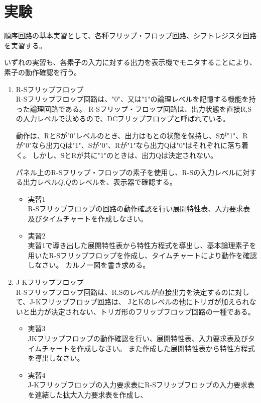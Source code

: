 \documentclass[dvipdfmx]{jsarticle}
\begin{document}
	\section{実験}
		順序回路の基本実習として、各種フリップ・フロップ回路、シフトレジスタ回路を実習する。\par
		いずれの実習も、各素子の入力に対する出力を表示機でモニタすることにより、素子の動作確認を行う。
		\begin{enumerate}
			\item R-Sフリップフロップ \\
				R-Sフリップフロップ回路は、"0"、又は"1"の論理レベルを記憶する機能を持った論理回路である。
				R-Sフリップ・フロップ回路は、出力状態を直接R,Sの入力レベルで決めるので、DCフリップフロップと呼ばれている。\par
				動作は、RとSが"0"レベルのとき、出力はもとの状態を保持し、Sが"1"、Rが"0"なら出力Qは"1"、Sが"0"、Rが"1"なら出力Qは"0"はそれぞれに落ち着く。
				しかし、SとRが共に"1"のときは、出力Qは決定されない。\par
				パネル上のR-Sフリップ・フロップの素子を使用し、R-Sの入力レベルに対する出力レベル$Q$,$\bar{Q}$のレベルを、表示器で確認する。
				\begin{itemize}
					\item 実習1 \\
					R-Sフリップフロップの回路の動作確認を行い展開特性表、入力要求表及びタイムチャートを作成しなさい。
					\item 実習2 \\
					実習1で導き出した展開特性表から特性方程式を導出し、基本論理素子を用いたR-Sフリップフロップを作成し、タイムチャートにより動作を確認しなさい。
					カルノー図を書き求める。
				\end{itemize}
			\item J-Kフリップフロップ \\
				R-Sフリップフロップ回路は、R,Sのレベルが直接出力を決定するのに対して、J-Kフリップフロップ回路は、
				JとKのレベルの他にトリガが加えられないと出力が決定されない、トリガ形のフリップフロップ回路の一種である。\par
				\begin{itemize}
					\item 実習3 \\
						JKフリップフロップの動作確認を行い、展開特性表、入力要求表及びタイムチャートを作成しなさい。
						また作成した展開特性表から特性方程式を導出しなさい。
					\item 実習4 \\
						J-Kフリップフロップの入力要求表にR-Sフリップフロップの入力要求表を連結した拡大入力要求表を作成し、

\end{itemize}
\end{enumerate}
\end{document}
